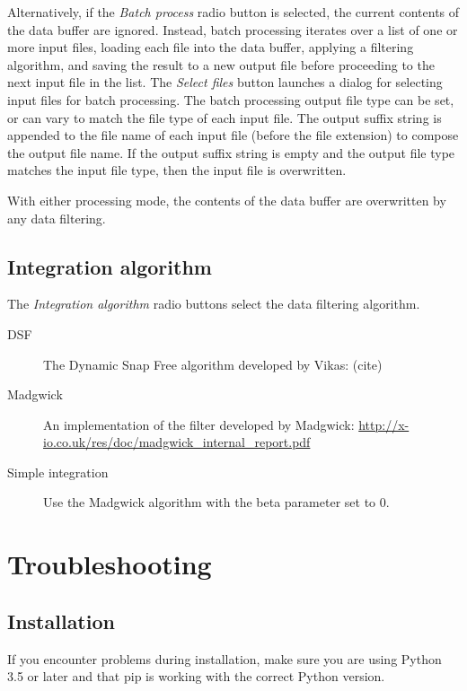 \documentclass[11pt,letterpaper,article,oneside]{memoir}
\begin{document}
Alternatively, if the \emph{Batch process} radio button is selected, the current
contents of the data buffer are ignored. Instead, batch processing iterates over
a list of one or more input files, loading each file into the data buffer,
applying a filtering algorithm, and saving the result to a new output file
before proceeding to the next input file in the list. The \emph{Select files}
button launches a dialog for selecting input files for batch processing.  The
batch processing output file type can be set, or can vary to match the file type
of each input file. The output suffix string is appended to the file name of each
input file (before the file extension) to compose the output file name. If the
output suffix string is empty and the output file type matches the input
file type, then the input file is overwritten.

With either processing mode, the contents of the data buffer are overwritten by
any data filtering.

\section{Integration algorithm}

The \emph{Integration algorithm} radio buttons select the data filtering
algorithm.

\begin{description}

\item[DSF]
The Dynamic Snap Free algorithm developed by Vikas: (cite)
\item[Madgwick] \hfill
An implementation of the filter developed by Madgwick: 
\url{http://x-io.co.uk/res/doc/madgwick_internal_report.pdf}
\item[Simple integration] \hfill
Use the Madgwick algorithm with the beta parameter set to 0.

\end{description}





\chapter{Troubleshooting}

\section{Installation}

If you encounter problems during installation, make sure you are using Python
3.5 or later and that pip is working with the correct Python version.
\end{document}
